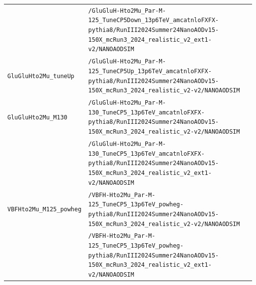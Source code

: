 \begin{longtable}{@{}>{\RaggedRight\arraybackslash}p{} >{\RaggedRight\arraybackslash}p{}@{}}
 & \texttt{/\allowbreak{}GluGluH-\allowbreak{}Hto2Mu\_\allowbreak{}Par-\allowbreak{}M-\allowbreak{}125\_\allowbreak{}TuneCP5Down\_\allowbreak{}13p6TeV\_\allowbreak{}amcatnloFXFX-\allowbreak{}pythia8/\allowbreak{}RunIII2024Summer24NanoAODv15-\allowbreak{}150X\_\allowbreak{}mcRun3\_\allowbreak{}2024\_\allowbreak{}realistic\_\allowbreak{}v2\_\allowbreak{}ext1-\allowbreak{}v2/\allowbreak{}NANOAODSIM} \\
\addlinespace[2pt]
\texttt{GluGluHto2Mu\_\allowbreak{}tuneUp} & \texttt{/\allowbreak{}GluGluH-\allowbreak{}Hto2Mu\_\allowbreak{}Par-\allowbreak{}M-\allowbreak{}125\_\allowbreak{}TuneCP5Up\_\allowbreak{}13p6TeV\_\allowbreak{}amcatnloFXFX-\allowbreak{}pythia8/\allowbreak{}RunIII2024Summer24NanoAODv15-\allowbreak{}150X\_\allowbreak{}mcRun3\_\allowbreak{}2024\_\allowbreak{}realistic\_\allowbreak{}v2-\allowbreak{}v2/\allowbreak{}NANOAODSIM} \\
\addlinespace[2pt]
\texttt{GluGluHto2Mu\_\allowbreak{}M130} & \texttt{/\allowbreak{}GluGluH-\allowbreak{}Hto2Mu\_\allowbreak{}Par-\allowbreak{}M-\allowbreak{}130\_\allowbreak{}TuneCP5\_\allowbreak{}13p6TeV\_\allowbreak{}amcatnloFXFX-\allowbreak{}pythia8/\allowbreak{}RunIII2024Summer24NanoAODv15-\allowbreak{}150X\_\allowbreak{}mcRun3\_\allowbreak{}2024\_\allowbreak{}realistic\_\allowbreak{}v2-\allowbreak{}v2/\allowbreak{}NANOAODSIM} \\
 & \texttt{/\allowbreak{}GluGluH-\allowbreak{}Hto2Mu\_\allowbreak{}Par-\allowbreak{}M-\allowbreak{}130\_\allowbreak{}TuneCP5\_\allowbreak{}13p6TeV\_\allowbreak{}amcatnloFXFX-\allowbreak{}pythia8/\allowbreak{}RunIII2024Summer24NanoAODv15-\allowbreak{}150X\_\allowbreak{}mcRun3\_\allowbreak{}2024\_\allowbreak{}realistic\_\allowbreak{}v2\_\allowbreak{}ext1-\allowbreak{}v2/\allowbreak{}NANOAODSIM} \\
\addlinespace[2pt]
\texttt{VBFHto2Mu\_\allowbreak{}M125\_\allowbreak{}powheg} & \texttt{/\allowbreak{}VBFH-\allowbreak{}Hto2Mu\_\allowbreak{}Par-\allowbreak{}M-\allowbreak{}125\_\allowbreak{}TuneCP5\_\allowbreak{}13p6TeV\_\allowbreak{}powheg-\allowbreak{}pythia8/\allowbreak{}RunIII2024Summer24NanoAODv15-\allowbreak{}150X\_\allowbreak{}mcRun3\_\allowbreak{}2024\_\allowbreak{}realistic\_\allowbreak{}v2-\allowbreak{}v2/\allowbreak{}NANOAODSIM} \\
 & \texttt{/\allowbreak{}VBFH-\allowbreak{}Hto2Mu\_\allowbreak{}Par-\allowbreak{}M-\allowbreak{}125\_\allowbreak{}TuneCP5\_\allowbreak{}13p6TeV\_\allowbreak{}powheg-\allowbreak{}pythia8/\allowbreak{}RunIII2024Summer24NanoAODv15-\allowbreak{}150X\_\allowbreak{}mcRun3\_\allowbreak{}2024\_\allowbreak{}realistic\_\allowbreak{}v2\_\allowbreak{}ext1-\allowbreak{}v2/\allowbreak{}NANOAODSIM} \\

\end{longtable}

